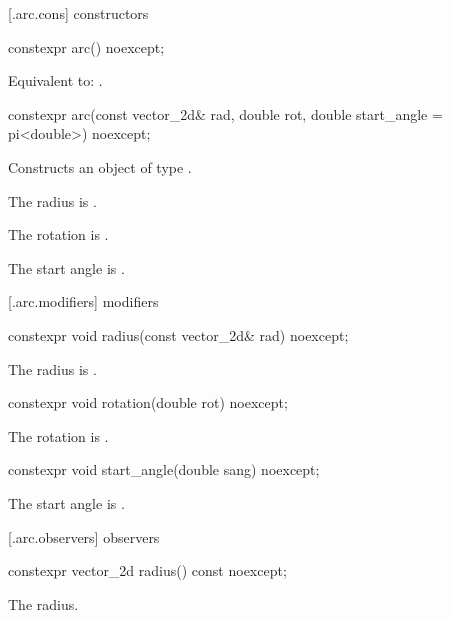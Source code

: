  [\iotwod.arc.cons] { constructors}

%
\begin{itemdecl}
constexpr arc() noexcept;
\end{itemdecl}
\begin{itemdescr}
\pnum
\effects
Equivalent to: .
\end{itemdescr}

%
\begin{itemdecl}
constexpr arc(const vector_2d& rad, double rot,
  double start_angle = pi<double>) noexcept;
\end{itemdecl}
\begin{itemdescr}
\pnum
\effects
Constructs an object of type .

\pnum
The radius is .

\pnum
The rotation is .

\pnum
The start angle is .
\end{itemdescr}

 [\iotwod.arc.modifiers]{ modifiers}

%
\begin{itemdecl}
constexpr void radius(const vector_2d& rad) noexcept;
\end{itemdecl}
\begin{itemdescr}
\pnum
\effects
The radius is .
\end{itemdescr}

%
\begin{itemdecl}
constexpr void rotation(double rot) noexcept;
\end{itemdecl}
\begin{itemdescr}
\pnum
\effects
The rotation is .
\end{itemdescr}

%
\begin{itemdecl}
constexpr void start_angle(double sang) noexcept;
\end{itemdecl}
\begin{itemdescr}
\pnum
\effects
The start angle is .
\end{itemdescr}

 [\iotwod.arc.observers]{ observers}

%
\begin{itemdecl}
constexpr vector_2d radius() const noexcept;
\end{itemdecl}
\begin{itemdescr}
\pnum
\returns
The radius.
\end{itemdescr}

